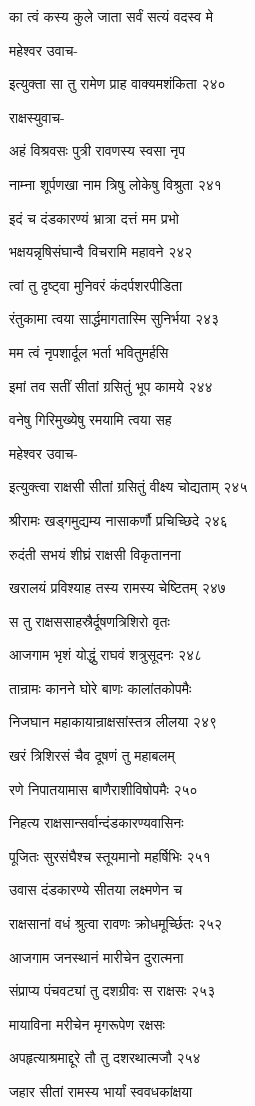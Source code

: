 का त्वं कस्य कुले जाता सर्वं सत्यं वदस्व मे

महेश्वर उवाच-

इत्युक्ता सा तु रामेण प्राह वाक्यमशंकिता २४०

राक्षस्युवाच-

अहं विश्रवसः पुत्री रावणस्य स्वसा नृप

नाम्ना शूर्पणखा नाम त्रिषु लोकेषु विश्रुता २४१

इदं च दंडकारण्यं भ्रात्रा दत्तं मम प्रभो

भक्षयन्नृषिसंघान्वै विचरामि महावने २४२

त्वां तु दृष्ट्वा मुनिवरं कंदर्पशरपीडिता

रंतुकामा त्वया सार्द्धमागतास्मि सुनिर्भया २४३

मम त्वं नृपशार्दूल भर्ता भवितुमर्हसि

इमां तव सतीं सीतां ग्रसितुं भूप कामये २४४

वनेषु गिरिमुख्येषु रमयामि त्वया सह

महेश्वर उवाच-

इत्युक्त्वा राक्षसी सीतां ग्रसितुं वीक्ष्य चोद्यताम् २४५

श्रीरामः खड्गमुद्यम्य नासाकर्णौ प्रचिच्छिदे २४६

रुदंती सभयं शीघ्रं राक्षसी विकृतानना

खरालयं प्रविश्याह तस्य रामस्य चेष्टितम् २४७

स तु राक्षससाहस्रैर्दूषणत्रिशिरो वृतः

आजगाम भृशं योद्धुं राघवं शत्रुसूदनः २४८

तान्रामः कानने घोरे बाणः कालांतकोपमैः

निजघान महाकायान्राक्षसांस्तत्र लीलया २४९

खरं त्रिशिरसं चैव दूषणं तु महाबलम्

रणे निपातयामास बाणैराशीविषोपमैः २५०

निहत्य राक्षसान्सर्वान्दंडकारण्यवासिनः

पूजितः सुरसंघैश्च स्तूयमानो महर्षिभिः २५१

उवास दंडकारण्ये सीतया लक्ष्मणेन च

राक्षसानां वधं श्रुत्वा रावणः क्रोधमूर्च्छितः २५२

आजगाम जनस्थानं मारीचेन दुरात्मना

संप्राप्य पंचवट्यां तु दशग्रीवः स राक्षसः २५३

मायाविना मरीचेन मृगरूपेण रक्षसः

अपहृत्याश्रमाद्दूरे तौ तु दशरथात्मजौ २५४

जहार सीतां रामस्य भार्यां स्ववधकांक्षया

